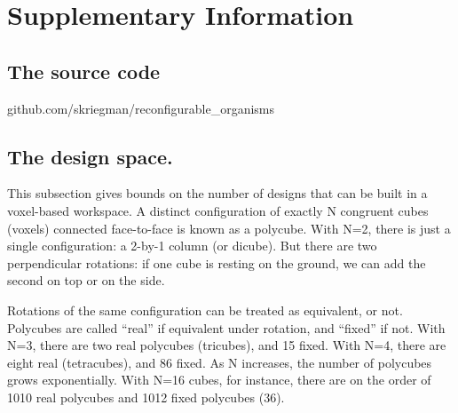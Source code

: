 \section{Supplementary Information}






\subsection*{The source code}  

github.com/skriegman/reconfigurable\_organisms


\subsection*{The design space.}

This subsection gives bounds on the number of designs that can be built in a voxel-based workspace.
A distinct configuration of exactly N congruent cubes (voxels) connected face-to-face is known as a polycube. With N=2, there is just a single configuration: a 2-by-1 column (or dicube). But there are two perpendicular rotations: if one cube is resting on the ground, we can add the second on top or on the side. 

Rotations of the same configuration can be treated as equivalent, or not. Polycubes are called ``real'' if equivalent under rotation, and ``fixed'' if not. With N=3, there are two real polycubes (tricubes), and 15 fixed. With N=4, there are eight real (tetracubes), and 86 fixed. As N increases, the number of polycubes grows exponentially. With N=16 cubes, for instance, there are on the order of 1010 real polycubes and 1012 fixed polycubes (36). 


